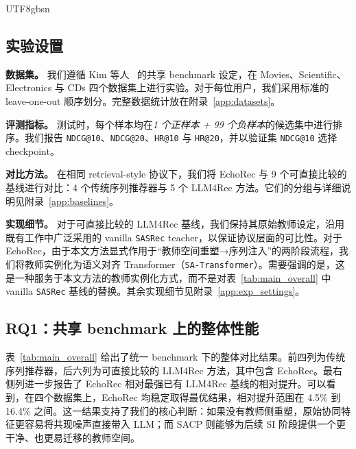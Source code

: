 \documentclass{article}
\begin{document}
\begin{CJK*}{UTF8}{gbsn}
\subsection{实验设置}

\noindent\textbf{数据集。} 我们遵循 Kim 等人~\cite{kim2025lost} 的共享 benchmark 设定，在 Movies、Scientific、Electronics 与 CDs 四个数据集上进行实验。对于每位用户，我们采用标准的 leave-one-out 顺序划分。完整数据统计放在附录~\ref{app:datasets}。

\noindent\textbf{评测指标。} 测试时，每个样本均在\emph{1 个正样本 + 99 个负样本}的候选集中进行排序。我们报告 \texttt{NDCG@10}、\texttt{NDCG@20}、\texttt{HR@10} 与 \texttt{HR@20}，并以验证集 \texttt{NDCG@10} 选择 checkpoint。

\noindent\textbf{对比方法。} 在相同 retrieval-style 协议下，我们将 EchoRec 与 9 个可直接比较的基线进行对比：4 个传统序列推荐器与 5 个 LLM4Rec 方法。它们的分组与详细说明见附录~\ref{app:baselines}。

\noindent\textbf{实现细节。} 对于可直接比较的 LLM4Rec 基线，我们保持其原始教师设定，沿用既有工作中广泛采用的 vanilla \texttt{SASRec} teacher，以保证协议层面的可比性。对于 EchoRec，由于本文方法显式作用于“教师空间重塑→序列注入”的两阶段流程，我们将教师实例化为语义对齐 Transformer（\texttt{SA-Transformer}）。需要强调的是，这是一种服务于本文方法的教师实例化方式，而不是对表~\ref{tab:main_overall} 中 vanilla \texttt{SASRec} 基线的替换。其余实现细节见附录~\ref{app:exp_settings}。

\subsection{RQ1：共享 benchmark 上的整体性能}
\label{subsec:rq1}

表~\ref{tab:main_overall} 给出了统一 benchmark 下的整体对比结果。前四列为传统序列推荐器，后六列为可直接比较的 LLM4Rec 方法，其中包含 EchoRec。最右侧列进一步报告了 EchoRec 相对最强已有 LLM4Rec 基线的相对提升。可以看到，在四个数据集上，EchoRec 均稳定取得最优结果，相对提升范围在 4.5\% 到 16.4\% 之间。这一结果支持了我们的核心判断：如果没有教师侧重塑，原始协同特征更容易将共现噪声直接带入 LLM；而 SACP 则能够为后续 SI 阶段提供一个更干净、也更易迁移的教师空间。


\end{CJK*}
\end{document}

